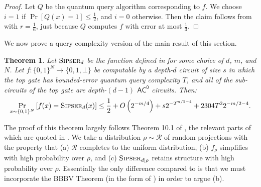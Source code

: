 \documentclass[11pt]{article}%
\newtheorem{theorem}{Theorem}
\newcommand{\Sipser}{\normalfont\textsc{Sipser}}
\begin{document}
\begin{proof}
Let $Q$ be the quantum query algorithm corresponding to $f$. We choose $i = 1$ if $\Pr\left[Q(x) = 1\right] \le \frac{1}{2}$, and $i = 0$ otherwise. Then the claim follows from  with $r = \frac{1}{6}$, just because $Q$ computes $f$ with error at most $\frac{1}{3}$.
\end{proof}

We now prove a query complexity version of the main result of this section.

\begin{theorem}
\label{thm:bqp_sigma_k_query_version}
Let $\Sipser_d$ be the function defined in  for some choice of $d$, $m$, and $N$. Let $f: \{0,1\}^N \to \{0,1,\bot\}$ be computable by a depth-$d$ circuit of size $s$ in which the top gate has bounded-error quantum query complexity $T$, and all of the sub-circuits of the top gate are depth-$(d-1)$ $\mathsf{AC^0}$ circuits. Then:
\[
\Pr_{x \sim \{0,1\}^N}\left[f(x) = \Sipser_d(x)\right] \le \frac{1}{2} + O\left(2^{-m/4}\right) + s2^{-2^{m/2 - 4}} + 2304T^22^{-m/2 -4}.
\]
\end{theorem}

The proof of this theorem largely follows Theorem 10.1 of \cite{HRST17}, the relevant parts of which are quoted in . We take a distribution $\rho \sim \mathcal{R}$ of random projections with the property that (a) $\mathcal{R}$ completes to the uniform distribution, (b) $f_\rho$ simplifies with high probability over $\rho$, and (c) $\Sipser_{d|\rho}$ retains structure with high probability over $\rho$. Essentially the only difference compared to \cite{HRST17} is that we must incorporate the BBBV Theorem (in the form of ) in order to argue (b).
\end{document}

